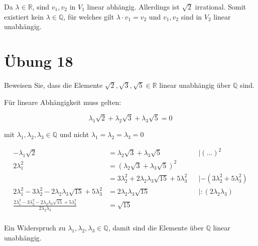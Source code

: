 \documentclass{article}
\begin{document}
Da $\lambda \in \mathbb{R}$, sind $v_1, v_2$ in $V_1$ linear abhängig. Allerdings ist $\sqrt{2}$ irrational. Somit existiert
kein $\lambda \in \mathbb{Q}$, für welches gilt $\lambda \cdot v_1 = v_2$ und $v_1, v_2$ sind in $V_2$ linear unabhängig.

\newpage
\section*{Übung 18}

Beweisen Sie, dass die Elemente $\sqrt{2}, \sqrt{3}, \sqrt{5} \in \mathbb{R}$ linear unabhängig über $\mathbb{Q}$
sind.

Für lineare Abhängigkeit muss gelten:

\[
  \lambda_1\sqrt{2} + \lambda_2\sqrt{3} + \lambda_3\sqrt{5} = 0 
\]

mit $\lambda_1, \lambda_2, \lambda_3 \in \mathbb{Q}$ und nicht $\lambda_1 = \lambda_2 = \lambda_3 = 0$

\begin{align*}
  -\lambda_1\sqrt{2} &= \lambda_2\sqrt{3} + \lambda_3\sqrt{5}                                                && | (\ldots)^2 \\
  2\lambda_1^2       &= (\lambda_2\sqrt{3} + \lambda_3\sqrt{5})^2 \\
                     &= 3\lambda_2^2 + 2\lambda_2\lambda_3\sqrt{15} + 5\lambda_3^2                           && | -(3\lambda_2^2 + 5\lambda_3^2) \\
  2\lambda_1^2 - 3\lambda_2^2  - 2\lambda_2\lambda_3\sqrt{15} + 5\lambda_3^2 &= 2\lambda_2\lambda_3\sqrt{15} && | :(2\lambda_2\lambda_3) \\                       
  \frac{2\lambda_1^2 - 3\lambda_2^2  - 2\lambda_2\lambda_3\sqrt{15} + 5\lambda_3^2}{2\lambda_2\lambda_3} &= \sqrt{15} \\         
\end{align*}

Ein Widerspruch zu $\lambda_1, \lambda_2, \lambda_3 \in \mathbb{Q}$, damit sind die Elemente über $\mathbb{Q}$
linear unabhängig.
\end{document}
